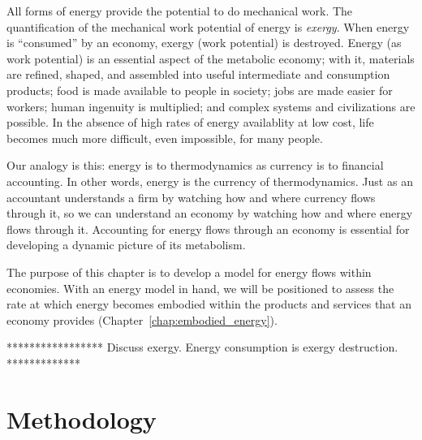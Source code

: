 All forms of energy provide the potential to do mechanical work. The 
quantification of the mechanical work potential of energy is \emph{exergy}.
When energy is ``consumed'' by an economy, exergy (work potential) is destroyed. 
Energy (as work potential) 
is an essential aspect of the metabolic economy;
with it, materials are refined, shaped, and assembled
into useful intermediate and consumption products; 
food is made available to people in society; 
jobs are made easier for workers;
human ingenuity is multiplied;
and complex systems and civilizations are possible.
In the absence of high rates of energy availablity at low cost,
life becomes much more difficult, even impossible, for many people.

Our analogy is this: 
energy is to thermodynamics as currency is to financial accounting.
In other words, energy is the currency of thermodynamics.
Just as an accountant understands a firm by watching how and where
currency flows through it, so we can understand an economy by watching
how and where energy flows through it.
Accounting for energy flows through an economy
is essential for developing a dynamic picture 
of its metabolism.

The purpose of this chapter is to develop 
a model for energy flows within economies.
With an energy model in hand, we will be positioned 
to assess the rate at which
energy becomes embodied within the products and 
services that an economy provides
(Chapter~\ref{chap:embodied_energy}).

***************** Discuss exergy. Energy consumption is exergy destruction. *************


\section{Methodology}
\label{sec:energy_methodology}

